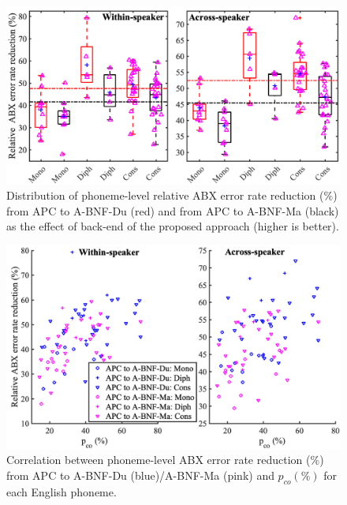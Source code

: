 \documentclass[transmag]{IEEEtran}
\begin{document}
\begin{figure}[!t]
    \centering
    \includegraphics[width= \linewidth]{boxplot_per_phoneme_abx_apc_to_bnf_triangle_adjust_journal.png}
    \caption{Distribution of phoneme-level relative ABX error rate reduction ($\%$) from APC to A-BNF-Du (red) and from APC to A-BNF-Ma (black) as the effect of back-end of the proposed approach (higher is better).}
    \label{fig:analyses_per_phone_apc_to_bnf_boxplot}
\end{figure}
\begin{figure}[!t]
    \centering
    \includegraphics[width= \linewidth]{correlate_per_phoneme_abx_reduc_apc_to_bnf_adjust_journal.png}
    \caption{Correlation between phoneme-level ABX error rate reduction ($\%$) from APC to A-BNF-Du (blue)/A-BNF-Ma (pink) and $p_{co} (\%)$  for each English phoneme.}
    \label{fig:analyses_per_phone_apc_to_bnf_correlation}
\end{figure}
\end{document}
